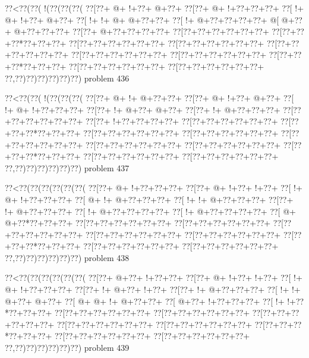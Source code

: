 \vbox{\vbox{\goo
\0??<\0??(\0??(\- !(\0??(\0??(\0??(
\0??[\0??+\- @+\- !+\0??+\- @+\0??+
\0??[\0??+\- @+\- !+\0??+\0??+\0??+
\0??[\- !+\- @+\- !+\0??+\- @+\0??+
\0??[\- !+\- !+\- @+\- @+\0??+\0??+
\0??[\- !+\- @+\0??+\0??+\0??+\0??+
\- @[\- @+\0??+\- @+\0??+\0??+\0??+
\0??[\0??+\- @+\0??+\0??+\0??+\0??+
\0??[\0??+\0??+\0??+\0??+\0??+\0??+
\0??[\0??+\0??+\0??*\0??+\0??+\0??+
\0??[\0??+\0??+\0??+\0??+\0??+\0??+
\0??[\0??+\0??+\0??+\0??+\0??+\0??+
\0??[\0??+\0??+\0??+\0??+\0??+\0??+
\0??[\0??+\0??+\0??+\0??+\0??+\0??+
\0??[\0??+\0??+\0??+\0??+\0??+\0??+
\0??[\0??+\0??+\0??*\0??+\0??+\0??+
\0??[\0??+\0??+\0??+\0??+\0??+\0??+
\0??[\0??+\0??+\0??+\0??+\0??+\0??+
\0??,\0??)\0??)\0??)\0??)\0??)\0??)
}
\hfil problem 436\hfil\break
}

\vbox{\vbox{\goo
\0??<\0??(\0??(\- !(\0??(\0??(\0??(
\0??[\0??+\- @+\- !+\- @+\0??+\0??+
\0??[\0??+\- @+\- !+\0??+\- @+\0??+
\0??[\- !+\- @+\- !+\0??+\0??+\0??+
\0??[\0??+\- !+\- @+\0??+\- @+\0??+
\0??[\0??+\- !+\- @+\0??+\0??+\0??+
\0??[\0??+\0??+\0??+\0??+\0??+\0??+
\0??[\0??+\- !+\0??+\0??+\0??+\0??+
\0??[\0??+\0??+\0??+\0??+\0??+\0??+
\0??[\0??+\0??+\0??*\0??+\0??+\0??+
\0??[\0??+\0??+\0??+\0??+\0??+\0??+
\0??[\0??+\0??+\0??+\0??+\0??+\0??+
\0??[\0??+\0??+\0??+\0??+\0??+\0??+
\0??[\0??+\0??+\0??+\0??+\0??+\0??+
\0??[\0??+\0??+\0??+\0??+\0??+\0??+
\0??[\0??+\0??+\0??*\0??+\0??+\0??+
\0??[\0??+\0??+\0??+\0??+\0??+\0??+
\0??[\0??+\0??+\0??+\0??+\0??+\0??+
\0??,\0??)\0??)\0??)\0??)\0??)\0??)
}
\hfil problem 437\hfil\break
}

\vbox{\vbox{\goo
\0??<\0??(\0??(\0??(\0??(\0??(\0??(
\0??[\0??+\- @+\- !+\0??+\0??+\0??+
\0??[\0??+\- @+\- !+\0??+\- !+\0??+
\0??[\- !+\- @+\- !+\0??+\0??+\0??+
\0??[\- @+\- !+\- @+\0??+\0??+\0??+
\0??[\- !+\- !+\- @+\0??+\0??+\0??+
\0??[\0??+\- !+\- @+\0??+\0??+\0??+
\0??[\- !+\- @+\0??+\0??+\0??+\0??+
\0??[\- !+\- @+\0??+\0??+\0??+\0??+
\0??[\- @+\- @+\0??*\0??+\0??+\0??+
\0??[\0??+\0??+\0??+\0??+\0??+\0??+
\0??[\0??+\0??+\0??+\0??+\0??+\0??+
\0??[\0??+\0??+\0??+\0??+\0??+\0??+
\0??[\0??+\0??+\0??+\0??+\0??+\0??+
\0??[\0??+\0??+\0??+\0??+\0??+\0??+
\0??[\0??+\0??+\0??*\0??+\0??+\0??+
\0??[\0??+\0??+\0??+\0??+\0??+\0??+
\0??[\0??+\0??+\0??+\0??+\0??+\0??+
\0??,\0??)\0??)\0??)\0??)\0??)\0??)
}
\hfil problem 438\hfil\break
}

\vbox{\vbox{\goo
\0??<\0??(\0??(\0??(\0??(\0??(\0??(
\0??[\0??+\- @+\0??+\- !+\0??+\0??+
\0??[\0??+\- @+\- !+\0??+\- !+\0??+
\0??[\- !+\- @+\- !+\0??+\0??+\0??+
\0??[\0??+\- !+\- @+\0??+\- !+\0??+
\0??[\0??+\- !+\- @+\0??+\0??+\0??+
\0??[\- !+\- !+\- @+\0??+\- @+\0??+
\0??[\- @+\- @+\- !+\- @+\0??+\0??+
\0??[\- @+\0??+\- !+\0??+\0??+\0??+
\0??[\- !+\- !+\0??*\0??+\0??+\0??+
\0??[\0??+\0??+\0??+\0??+\0??+\0??+
\0??[\0??+\0??+\0??+\0??+\0??+\0??+
\0??[\0??+\0??+\0??+\0??+\0??+\0??+
\0??[\0??+\0??+\0??+\0??+\0??+\0??+
\0??[\0??+\0??+\0??+\0??+\0??+\0??+
\0??[\0??+\0??+\0??*\0??+\0??+\0??+
\0??[\0??+\0??+\0??+\0??+\0??+\0??+
\0??[\0??+\0??+\0??+\0??+\0??+\0??+
\0??,\0??)\0??)\0??)\0??)\0??)\0??)
}
\hfil problem 439\hfil\break
}

